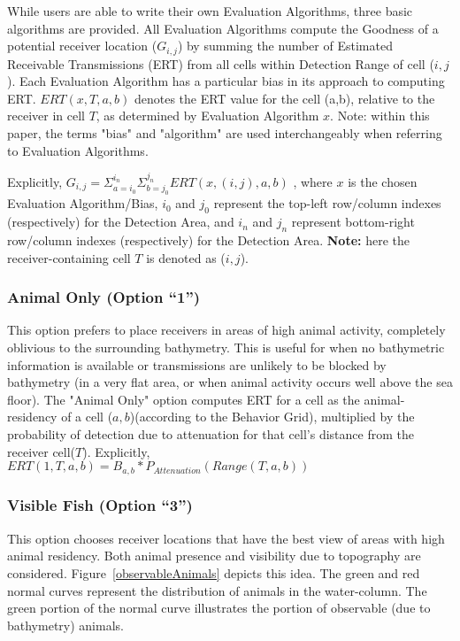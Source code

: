 While users are able to write their own Evaluation Algorithms, three basic algorithms are provided.  All Evaluation Algorithms compute the Goodness of a potential receiver location ($G_{i,j}$) by summing the number of Estimated Receivable Transmissions (ERT) from all cells within Detection Range of cell ($i,j$).  Each Evaluation Algorithm has a particular bias in its approach to computing ERT.  $ERT(x,T,a,b)$ denotes the ERT value for the cell (a,b), relative to the receiver in cell $T$, as determined by Evaluation Algorithm $x$.  Note: within this paper, the terms "bias" and "algorithm" are used interchangeably when referring to Evaluation Algorithms.

Explicitly, $G_{i,j} = \Sigma_{a=i_0}^{i_n} \Sigma_{b=j_0}^{j_n} ERT(x,(i,j),a,b)$ , where $x$ is the chosen Evaluation Algorithm/Bias, $i_0$ and $j_0$ represent the top-left row/column indexes (respectively) for the Detection Area, and $i_n$ and $j_n$ represent bottom-right row/column indexes (respectively) for the Detection Area.  
\newline\textbf{Note:} here the receiver-containing cell $T$ is denoted as ($i,j$).

\subsubsection{Animal Only (Option “1”)}
\label{bias1}
This option prefers to place receivers in areas of high animal activity, completely oblivious to the surrounding bathymetry.  This is useful for when no bathymetric information is available or transmissions are unlikely to be blocked by bathymetry (in a very flat area, or when animal activity occurs well above the sea floor).  The "Animal Only" option computes ERT for a cell as the animal-residency of a cell ($a,b$)(according to the Behavior Grid), multiplied by the probability of detection due to attenuation for that cell's distance from the receiver cell($T$).\newline
Explicitly,
$ERT(1,T,a,b) = B_{a,b} * P_{Attenuation}(Range(T,a,b))$

\subsubsection{Visible Fish (Option “3”)}
\label{bias3}
This option chooses receiver locations that have the best view of areas with high animal residency.  Both animal presence and visibility due to topography are considered.  Figure~\ref{observableAnimals} depicts this idea.  The green and red normal curves represent the distribution of animals in the water-column.  The green portion of the normal curve illustrates the portion of observable (due to bathymetry) animals.  

